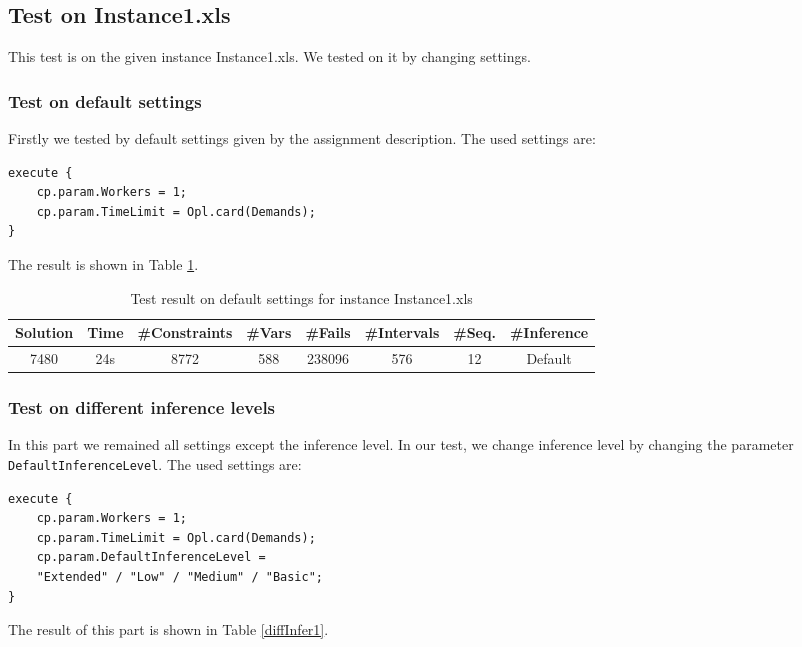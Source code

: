 \documentclass[a4paper, 12pt]{article}
\begin{document}
\subsection{Test on Instance1.xls}

This test is on the given instance Instance1.xls. We tested on it by changing settings. 

\subsubsection{Test on default settings}

Firstly we tested by default settings given by the assignment description. The used settings are: 

\begin{lstlisting}
execute {
    cp.param.Workers = 1;
    cp.param.TimeLimit = Opl.card(Demands); 
}
\end{lstlisting}

The result is shown in Table \ref{default1}. 

\begin{table}
    \centering
    \caption{Test result on default settings for instance Instance1.xls}
    \label{default1}
    \begin{tabular}{|c|c|c|c|c|c|c|c|}
        \hline
        Solution & Time & \#Constraints & \#Vars & \#Fails & \#Intervals & \#Seq. & \#Inference \\
        \hline
        7480 & 24s & 8772 & 588 & 238096 & 576 & 12 & Default \\
        \hline
    \end{tabular}
\end{table}

\subsubsection{Test on different inference levels}

In this part we remained all settings except the inference level. In our test, we change inference level by changing the parameter \texttt{DefaultInferenceLevel}. The used settings are: 

\begin{lstlisting}
execute {
    cp.param.Workers = 1;
    cp.param.TimeLimit = Opl.card(Demands); 
    cp.param.DefaultInferenceLevel = 
    "Extended" / "Low" / "Medium" / "Basic";
}
\end{lstlisting}

The result of this part is shown in Table \ref{diffInfer1}. 
\end{document}
